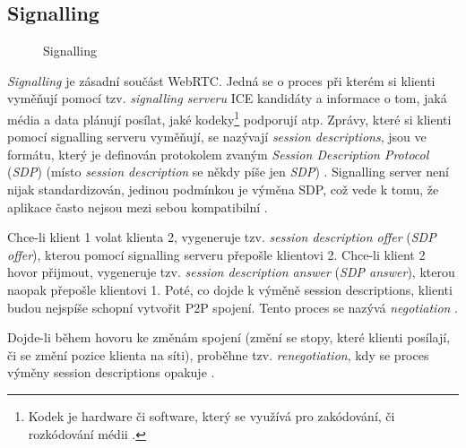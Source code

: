 \subsection{Signalling}\label{signalling}

\begin{figure}[H]
	\centering
	\caption{Signalling}
	\label{signallingServer}
\end{figure}

\textit{Signalling} je zásadní součást WebRTC. Jedná se o proces při kterém si
klienti vyměňují pomocí tzv. \textit{signalling serveru} ICE kandidáty a
informace o tom, jaká média a data plánují posílat, jaké kodeky\footnote{Kodek
je hardware či software, který se využívá pro zakódování, či rozkódování médii
\cite{Britannica-Codec,TechTarget-Codec}.} podporují atp. Zprávy, které si
klienti pomocí signalling serveru vyměňují, se nazývají \textit{session
descriptions}, jsou ve formátu, který je definován protokolem zvaným
\textit{Session Description Protocol} (\textit{SDP}) (místo \textit{session
description} se někdy píše jen \textit{SDP}) \cite{WebRTCForTheCurious}.
Signalling server není nijak standardizován, jedinou podmínkou je výměna SDP,
což vede k tomu, že aplikace často nejsou mezi sebou kompatibilní
\cite{MDN-Web-SignalingAndVideoCalling}.

Chce-li klient 1 volat klienta 2, vygeneruje tzv. \textit{session description
offer} (\textit{SDP offer}), kterou pomocí signalling serveru přepošle klientovi
2. Chce-li klient 2 hovor přijmout, vygeneruje tzv. \textit{session description
answer} (\textit{SDP answer}), kterou naopak přepošle klientovi 1. Poté, co
dojde k výměně session descriptions, klienti budou nejspíše schopní vytvořit P2P
spojení. Tento proces se nazývá
\textit{negotiation}
\cite{WebRTCForTheCurious,MozillaBlog-PerfectNegotiation}.

Dojde-li během hovoru ke změnám spojení (změní se stopy, které klienti posílají,
či se změní pozice klienta na síti), proběhne tzv. \textit{renegotiation}, kdy
se proces výměny session descriptions opakuje
\cite{MozillaBlog-PerfectNegotiation}.

